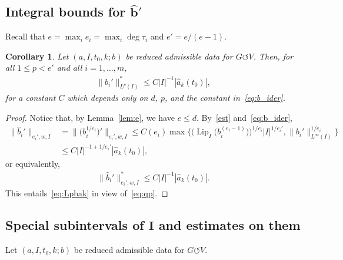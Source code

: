 \documentclass[11pt]{article}
\numberwithin{equation}{section}
\numberwithin{equation}{section}
\newtheorem{Corollary}[Theorem]{Corollary}
\def\ta{\tau}
\def\we{\hat}
\def\acts{\circlearrowleft}
\let\on=\operatorname
\begin{document}
\subsection[Integral bounds for hat b']
{Integral bounds for $\boldsymbol{\we b'}$}


Recall that $e = \max_i e_i = \max_i \deg \ta_i$ and $e' = e/(e-1)$.

\begin{Corollary} \label{lem:Lpbak}
 Let $(a, I, t_0, k; b)$ be reduced admissible data for $G \acts V$.
 Then, for all $1 \le p < e'$ and all $i=1,\dots,m$,
 \begin{gather} \label{eq:Lpbak}
\big \|\we b_i'\big\|^*_{L^p(I)} \le C |I|^{-1} |\we a_k(t_0)|,
 \end{gather}
 for a constant $C$ which depends only on $d$, $p$, and the constant in~\eqref{eq:b_ider}.
\end{Corollary}

\begin{proof}
 Notice that, by Lemma~\ref{lem:e}, we have $e \le d$. By~\eqref{est} and~\eqref{eq:b_ider},
 \begin{align*}
 \big\| \we b_i'\big\|_{e_i',w,I}&= \big\| \big(b_i^{1/e_i}\big)'\big\|_{e_i',w,I}\le C(e_i) \max \Big\{\big(\on{Lip}_{I}\big( b_i^{(e_i-1)}\big)\big)^{1/e_i}|I|^{1/e_i'},
 \|b_i'\|_{L^\infty(I)}^{1/e_i}\Big\}
 \\
 &\le C |I|^{-1 +1/e_i'} |\we a_k (t_0)|,
\end{align*}
or equivalently,
\begin{gather*}
 \big\|\we b_i'\big\|^*_{e_i',w,I} \le C |I|^{-1} | \we a_k (t_0)|.
\end{gather*}
This entails~\eqref{eq:Lpbak} in view of~\eqref{eq:qp}.
\end{proof}


\subsection[Special subintervals of I and estimates on them]
{Special subintervals of $\boldsymbol I$ and estimates on them}\label{subintervals}

Let $(a, I, t_0, k; b)$ be reduced admissible data for $G \acts V$.
\end{document}
